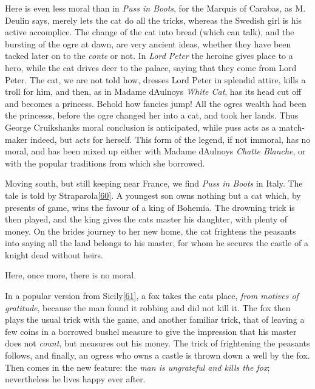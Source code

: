 \documentclass[14pt,a4paper]{memoir}
\begin{document}
Here is even less moral than in \emph{Puss in Boots}, for the Marquis of
Carabas, as M. Deulin says, merely lets the cat do all the tricks,
whereas the Swedish girl is his active accomplice. The change of the cat
into bread (which can talk), and the bursting of the ogre at dawn, are
very ancient ideas, whether they have been tacked later on to the
\emph{conte} or not. In \emph{Lord Peter} the heroine gives place to a
hero, while the cat drives deer to the palace, saying that they come
from Lord Peter. The cat, we are not told how, dresses Lord Peter in
splendid attire, kills a troll for him, and then, as in Madame
d\textquotesingle Aulnoy\textquotesingle s \emph{White Cat}, has its
head cut off and becomes a princess. Behold how fancies jump! All the
ogre\textquotesingle s wealth had been the princess\textquotesingle s,
before the ogre changed her into a cat, and took her lands. Thus George
Cruikshank\textquotesingle s moral conclusion is anticipated, while puss
acts as a match-maker indeed, but acts for herself. This form of the
legend, if not immoral, has no moral, and has been mixed up either with
Madame d\textquotesingle Aulnoy\textquotesingle s \emph{Chatte Blanche},
or with the popular traditions from which she borrowed.

Moving south, but still keeping near France, we find \emph{Puss in
Boots} in Italy. The tale is told by
Straparola\protect\hypertarget{4533318093929944247_33931-h-0.htm.xhtmlux5cux23FNanchor_60}{}{}\protect\hyperlink{4533318093929944247_33931-h-1.htm.xhtmlux5cux23Footnote_60}{{[}60{]}}.
A youngest son owns nothing but a cat which, by presents of game, wins
the favour of a king of Bohemia. The drowning trick is then played, and
the king gives the cat\textquotesingle s master his daughter, with
plenty of money. On the bride\textquotesingle s journey to her new home,
the cat frightens the peasants into saying all the land belongs to his
master, for whom he secures the castle of a knight dead without heirs.

Here, once more, there is no moral.

In a popular version from
Sicily\protect\hypertarget{4533318093929944247_33931-h-0.htm.xhtmlux5cux23FNanchor_61}{}{}\protect\hyperlink{4533318093929944247_33931-h-1.htm.xhtmlux5cux23Footnote_61}{{[}61{]}},
a fox takes the cat\textquotesingle s place, \emph{from motives of
gratitude}, because the man found it robbing and did not kill it. The
fox then plays the usual trick with the game, and another familiar
trick, that of leaving a few coins in a borrowed bushel measure to give
the impression that his master does not \emph{count}, but measures out
his money. The trick of frightening the peasants follows, and finally,
an ogress who owns a castle is thrown down a well by the fox. Then comes
in the new feature: the \emph{man is ungrateful and kills the fox};
nevertheless he lives happy ever after.
\end{document}
